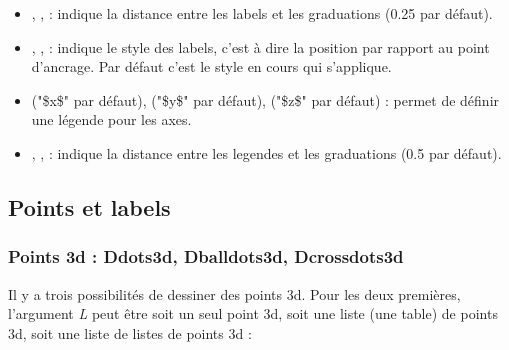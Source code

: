 \begin{itemize}
    \item {}, ,  : indique la distance entre les labels et les graduations (0.25 par défaut).
    
    \item {}, ,  : indique le style des labels, c'est à dire la position par rapport au point d'ancrage. Par défaut c'est le style en cours qui s'applique.

    \item {} ("\$x\$" par défaut),  ("\$y\$" par défaut),  ("\$z\$" par défaut) : permet de définir une légende pour les axes.
    
    \item {}, ,  : indique la distance entre les legendes et les graduations (0.5 par défaut).     
\end{itemize}

\subsection{Points et labels}

\subsubsection{Points 3d : Ddots3d, Dballdots3d, Dcrossdots3d}

Il y a trois possibilités de dessiner des points 3d. Pour les deux premières, l'argument \emph{L} peut être soit un seul point 3d, soit une liste (une table) de points 3d, soit une liste de listes de points 3d :


